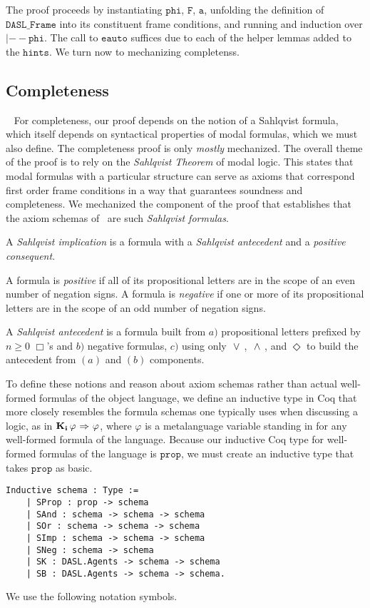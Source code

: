 The proof proceeds by instantiating $\mathtt{phi}$, $\mathtt{F}$, $\mathtt{a}$, unfolding the definition of $\mathtt{DASL\_Frame}$ into its constituent frame conditions, and running and induction over $\mathtt{|-- phi}$. The call to $\mathtt{eauto}$ suffices due to each of the helper lemmas added to the $\mathtt{hints}$. We turn now to mechanizing completenss.

\subsection{Completeness}~\label{sec:completeness}
For completeness, our proof depends on the notion of a Sahlqvist formula, which itself depends on syntactical properties of modal formulas, which we must also define. The completeness proof is only \emph{mostly} mechanized. The overall theme of the proof is to rely on the \emph{Sahlqvist Theorem} of modal logic. This states that modal formulas with a particular structure can serve as axioms that correspond first order frame conditions in a way that guarantees soundness and completeness. We mechanized the component of the proof that establishes that the axiom schemas of \DASL\ are such \emph{Sahlqvist formulas}. 

A \emph{Sahlqvist implication} is a formula with a \emph{Sahlqvist antecedent} and a \emph{positive consequent}.

A formula is \emph{positive} if all of its propositional letters are in the scope of an even number of negation signs. A formula is \emph{negative} if one or more of its propositional letters are in the scope of an odd number of negation signs.

A \emph{Sahlqvist antecedent} is a formula built from $a)$ propositional letters prefixed by $n\geq0$ $\Box$'s and $b)$ negative formulas, $c)$ using only ${\ \vee \ }$, ${\ \wedge \ }$, and $\Diamond$ to build the antecedent from $(a)$ and $(b)$ components.

To define these notions and reason about axiom schemas rather than actual well-formed formulas of the object language, we define an inductive type in Coq that more closely resembles the formula schemas one typically uses when discussing a logic, as in $\mathbf{K}_{\mathbf{i}}\,\varphi {\ \Rightarrow \ } \varphi$, where $\varphi$ is a metalanguage variable standing in for any well-formed formula of the language. Because our inductive Coq type for well-formed formulas of the language is $\mathtt{prop}$, we must create an inductive type that takes $\mathtt{prop}$ as basic.

\begin{tcolorbox}
	\begin{lstlisting}[language=Coq]
 Inductive schema : Type :=
	| SProp : prop -> schema
	| SAnd : schema -> schema -> schema
	| SOr : schema -> schema -> schema
	| SImp : schema -> schema -> schema
	| SNeg : schema -> schema
	| SK : DASL.Agents -> schema -> schema
	| SB : DASL.Agents -> schema -> schema.
	\end{lstlisting}	
	
\end{tcolorbox}
We use the following notation symbols.

